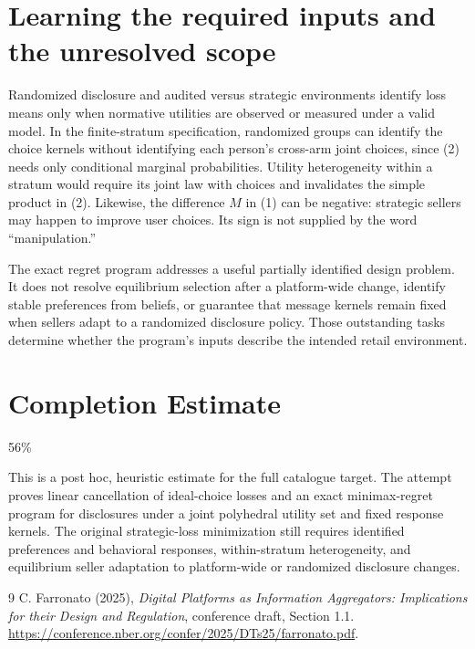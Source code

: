 \documentclass[11pt]{article}
\theoremstyle{definition}
\begin{document}
\section*{Learning the required inputs and the unresolved scope}
Randomized disclosure and audited versus strategic environments identify
loss means only when normative utilities are observed or measured under
a valid model. In the finite-stratum specification, randomized groups
can identify the choice kernels without identifying each person's
cross-arm joint choices, since (2) needs only conditional marginal
probabilities. Utility heterogeneity within a stratum would require its
joint law with choices and invalidates the simple product in (2).
Likewise, the difference $M$ in (1) can be negative: strategic sellers
may happen to improve user choices. Its sign is not supplied by the word
``manipulation.''

The exact regret program addresses a useful partially identified design
problem. It does not resolve equilibrium selection after a platform-wide
change, identify stable preferences from beliefs, or guarantee that message
kernels remain fixed when sellers adapt to a randomized disclosure policy.
Those outstanding tasks determine whether the program's inputs describe
the intended retail environment.

\section{Completion Estimate}
56\%

This is a post hoc, heuristic estimate for the full catalogue target.
The attempt proves linear cancellation of ideal-choice losses and an exact minimax-regret program for disclosures under a joint polyhedral utility set and fixed response kernels. The original strategic-loss minimization still requires identified preferences and behavioral responses, within-stratum heterogeneity, and equilibrium seller adaptation to platform-wide or randomized disclosure changes.

\begin{thebibliography}{9}
 C. Farronato (2025), \emph{Digital Platforms as
Information Aggregators: Implications for their Design and Regulation},
conference draft, Section 1.1.
\url{https://conference.nber.org/confer/2025/DTs25/farronato.pdf}.
\end{thebibliography}
\end{document}
